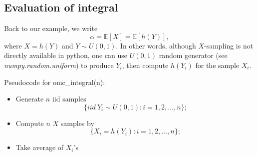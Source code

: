 \documentclass{article}
\begin{document}
\subsection{Evaluation of integral}
Back to our example, we write
$$\alpha = \mathbb E[X] = \mathbb E[h(Y)],$$
where $X = h(Y)$ and $Y\sim U(0,1)$.
In other words, although $X$-sampling is not directly available in python, 
one can use $U(0,1)$ random generator (see {\it numpy.random.uniform}) to produce $Y_i$, then compute $h(Y_i)$ for 
the sample $X_i$.

Pseudocode for omc\_integral(n):
\begin{itemize}
\item Generate $n$ iid samples $$\{iid \ Y_i\sim U(0,1): i = 1, 2, \ldots, n\};$$
\item Compute $n$ $X$ samples by
$$\{X_i = h(Y_i): i = 1, 2, \ldots, n\};$$
\item Take average of $X_i$'s
\end{itemize}
\end{document}
